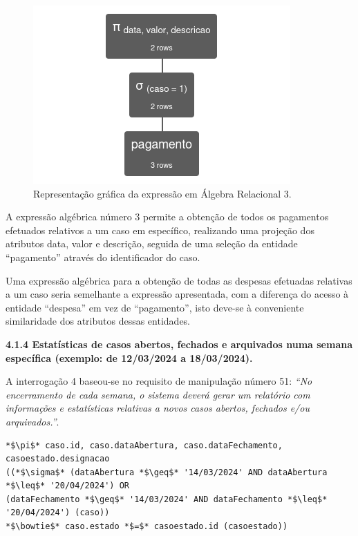 \documentclass[a4paper,12pt]{scrreprt}
\begin{document}
\begin{figure}[!ht]
    \centering
    \includegraphics[scale=0.9]{images/relax/3.png}
    \caption{Representação gráfica da expressão em Álgebra Relacional 3.}
\end{figure}
\vspace{0.2cm}

A expressão algébrica número 3 permite a obtenção de todos os pagamentos efetuados relativos a um caso em específico, realizando uma projeção dos atributos data, valor e descrição, seguida de uma seleção da entidade “pagamento” através do identificador do caso.

Uma expressão algébrica para a obtenção de todas as despesas efetuadas relativas a um caso seria semelhante a expressão apresentada, com a diferença do acesso à entidade “despesa” em vez de “pagamento”, isto deve-se à conveniente similaridade dos atributos dessas entidades. 

\clearpage %
{\large\textbf{4.1.4 Estatísticas de casos abertos, fechados e arquivados numa semana específica (exemplo: de 12/03/2024 a 18/03/2024).}}

\vspace{0.2cm}

A interrogação 4 baseou-se no requisito de manipulação número 51: \textit{“No encerramento de cada semana, o sistema deverá gerar um relatório com informações e estatísticas relativas a novos casos abertos, fechados e/ou arquivados.”}.

\vspace{0.2cm}

\begin{lstlisting}[escapechar=*]
*$\pi$* caso.id, caso.dataAbertura, caso.dataFechamento, casoestado.designacao
((*$\sigma$* (dataAbertura *$\geq$* '14/03/2024' AND dataAbertura *$\leq$* '20/04/2024') OR
(dataFechamento *$\geq$* '14/03/2024' AND dataFechamento *$\leq$* '20/04/2024') (caso))
*$\bowtie$* caso.estado *$=$* casoestado.id (casoestado))
\end{lstlisting}
\end{document}

